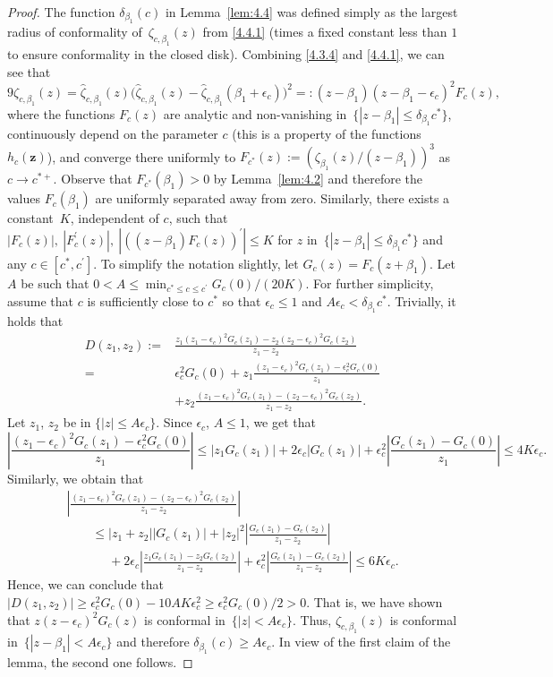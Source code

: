 \documentclass[10pt,a4paper]{amsart}
\numberwithin{equation}{section}
\newcommand{\z}	{{\boldsymbol z}}
\begin{document}
\begin{proof}
The function $ \delta_{\beta_1}(c) $ in Lemma~\ref{lem:4.4} was defined simply as the largest radius of conformality of~$ \zeta_{c,\beta_1}(z) $ from \eqref{4.4.1} (times a fixed constant less than $ 1 $ to ensure conformality in the closed disk). Combining \eqref{4.3.4} and \eqref{4.4.1}, we can see that
\[
9\zeta_{c,\beta_1}(z) = \hat\zeta_{c,\beta_1}(z)\bigl(\hat\zeta_{c,\beta_1}(z) - \hat\zeta_{c,\beta_1}(\beta_1+\epsilon_c) \bigr)^2 =: (z-\beta_1)(z-\beta_1-\epsilon_c)^2 F_c(z),
\]
where the functions $ F_c(z) $ are analytic and non-vanishing in~$ \{|z-\beta_1| \leq \delta_{\beta_1}c^* \} $, continuously depend on the parameter $ c $ (this is a property of the functions $ h_c(\z) $), and converge there uniformly to $ F_{c^*}(z) := (\zeta_{\beta_1}(z)/(z-\beta_1) )^3 $ as $ c\to c^{*+} $. Observe that $ F_{c^*}(\beta_1)>0 $ by Lemma~\ref{lem:4.2} and therefore the values $ F_c(\beta_1) $ are uniformly separated away from zero. Similarly, there exists a constant~$ K $, independent of $ c $, such that
$
|F_c(z)|,~|F_c^\prime(z)|,~|((z-\beta_1)F_c(z))^\prime| \leq K$
for $ z $ in~$ {\{|z-\beta_1| \leq \delta_{\beta_1}c^* \}} $ and any $ c\in[c^*,c^\prime] $. To simplify the notation slightly, let $ G_c(z) = F_c(z+\beta_1) $. Let $ A $ be such that $ 0< A\leq \min_{c^*\leq c\leq c^\prime}G_c(0)/(20K)$. For further simplicity, assume that $ c $ is sufficiently close to $ c^* $ so that $ \epsilon_c\leq 1 $ and $ A\epsilon_c<\delta_{\beta_1}c^* $. Trivially, it holds that
\begin{align*}
D(z_1,z_2):={} &\frac{z_1(z_1-\epsilon_c)^2G_c(z_1)-z_2(z_2-\epsilon_c)^2G_c(z_2)}{z_1-z_2}\\
 ={} & \epsilon_c^2 G_c(0) + z_1 \frac{(z_1-\epsilon_c)^2 G_c(z_1)-\epsilon_c^2 G_c(0)}{z_1}\\
 & + z_2 \frac{(z_1-\epsilon_c)^2 G_c(z_1)-(z_2 - \epsilon_c)^2 G_c(z_2)}{z_1-z_2}.
\end{align*}
Let $ z_1$, $z_2 $ be in $ \{ |z| \leq A\epsilon_c\} $. Since $ \epsilon_c$, $A\leq 1 $, we get that
\[
\left|\frac{(z_1-\epsilon_c)^2 G_c(z_1)-\epsilon_c^2 G_c(0)}{z_1}\right| \leq |z_1G_c(z_1)| + 2\epsilon_c|G_c(z_1)| + \epsilon_c^2\left|\frac{G_c(z_1)-G_c(0)}{z_1}\right| \leq 4K\epsilon_c.
\]
Similarly, we obtain that
\begin{gather*}
\left| \frac{(z_1-\epsilon_c)^2 G_c(z_1)-(z_2 - \epsilon_c)^2 G_c(z_2)}{z_1-z_2} \right| \\
\qquad\leq |z_1+z_2||G_c(z_1)| + |z_2|^2\left|\frac{G_c(z_1)-G_c(z_2)}{z_1-z_2}\right| \\
\qquad\phantom{\leq}{} + 2\epsilon_c \left| \frac{z_1G_c(z_1)-z_2G_c(z_2)}{z_1-z_2} \right| + \epsilon_c^2\left|\frac{G_c(z_1)-G_c(z_2)}{z_1-z_2}\right| \leq 6K\epsilon_c.
\end{gather*}
Hence, we can conclude that
$
|D(z_1,z_2)| \geq \epsilon_c^2 G_c(0) - 10AK\epsilon_c^2 \geq \epsilon_c^2 G_c(0)/2>0$.
That is, we have shown that $ z(z-\epsilon_c)^2G_c(z) $ is conformal in~$ {\{ |z|<A\epsilon_c\}} $. Thus, $ \zeta_{c,\beta_1}(z) $ is conformal in~$ {\{|z-\beta_1|<A\epsilon_c\}} $ and therefore $ \delta_{\beta_1}(c)\geq A\epsilon_c $. In view of the first claim of the lemma, the second one follows.
\end{proof}
\end{document}

